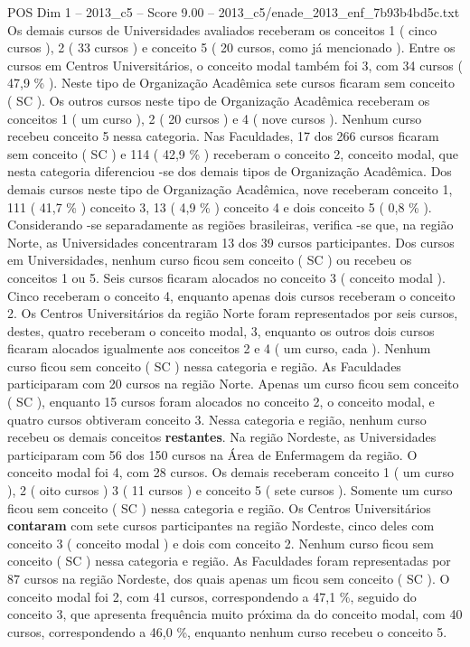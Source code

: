 \begin{textsample}{POS Dim 1 – 2013\_c5 – Score 9.00 – 2013\_c5/enade\_2013\_enf\_7b93b4bd5c.txt}
Os demais cursos de Universidades avaliados receberam os conceitos 1 ( cinco cursos ), 2 ( 33 cursos ) e conceito 5 ( 20 cursos, como já mencionado ).
Entre os cursos em Centros Universitários, o conceito modal também foi 3, com 34 cursos ( 47,9 \% ).
Neste tipo de Organização Acadêmica sete cursos ficaram sem conceito ( SC ).
Os outros cursos neste tipo de Organização Acadêmica receberam os conceitos 1 ( um curso ), 2 ( 20 cursos ) e 4 ( nove cursos ).
Nenhum curso recebeu conceito 5 nessa categoria.
Nas Faculdades, 17 dos 266 cursos ficaram sem conceito ( SC ) e 114 ( 42,9 \% ) receberam o conceito 2, conceito modal, que nesta categoria diferenciou -se dos demais tipos de Organização Acadêmica.
Dos demais cursos neste tipo de Organização Acadêmica, nove receberam conceito 1, 111 ( 41,7 \% ) conceito 3, 13 ( 4,9 \% ) conceito 4 e dois conceito 5 ( 0,8 \% ).
Considerando -se separadamente as regiões brasileiras, verifica -se que, na região Norte, as Universidades concentraram 13 dos 39 cursos participantes.
Dos cursos em Universidades, nenhum curso ficou sem conceito ( SC ) ou recebeu os conceitos 1 ou 5.
Seis cursos ficaram alocados no conceito 3 ( conceito modal ).
Cinco receberam o conceito 4, enquanto apenas dois cursos receberam o conceito 2.
Os Centros Universitários da região Norte foram representados por seis cursos, destes, quatro receberam o conceito modal, 3, enquanto os outros dois cursos ficaram alocados igualmente aos conceitos 2 e 4 ( um curso, cada ).
Nenhum curso ficou sem conceito ( SC ) nessa categoria e região.
As Faculdades participaram com 20 cursos na região Norte.
Apenas um curso ficou sem conceito ( SC ), enquanto 15 cursos foram alocados no conceito 2, o conceito modal, e quatro cursos obtiveram conceito 3.
Nessa categoria e região, nenhum curso recebeu os demais conceitos \textbf{restantes}.
Na região Nordeste, as Universidades participaram com 56 dos 150 cursos na Área de Enfermagem da região.
O conceito modal foi 4, com 28 cursos.
Os demais receberam conceito 1 ( um curso ), 2 ( oito cursos ) 3 ( 11 cursos ) e conceito 5 ( sete cursos ).
Somente um curso ficou sem conceito ( SC ) nessa categoria e região.
Os Centros Universitários \textbf{contaram} com sete cursos participantes na região Nordeste, cinco deles com conceito 3 ( conceito modal ) e dois com conceito 2.
Nenhum curso ficou sem conceito ( SC ) nessa categoria e região.
As Faculdades foram representadas por 87 cursos na região Nordeste, dos quais apenas um ficou sem conceito ( SC ).
O conceito modal foi 2, com 41 cursos, correspondendo a 47,1 \%, seguido do conceito 3, que apresenta frequência muito próxima da do conceito modal, com 40 cursos, correspondendo a 46,0 \%, enquanto nenhum curso recebeu o conceito 5.

\end{textsample}
